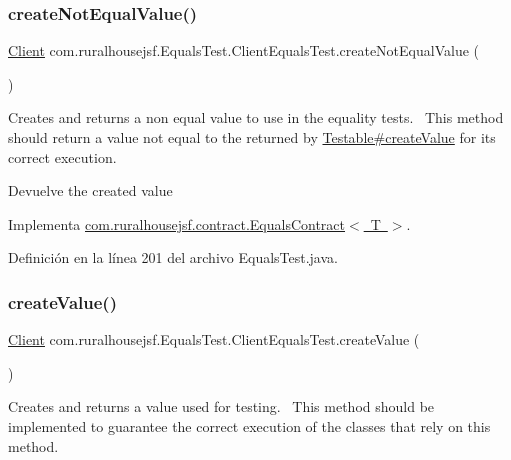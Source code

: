 \subsubsection{\texorpdfstring{createNotEqualValue()}{createNotEqualValue()}}
{\footnotesize\ttfamily \mbox{\hyperlink{classcom_1_1ruralhousejsf_1_1domain_1_1_client}{Client}} com.\+ruralhousejsf.\+Equals\+Test.\+Client\+Equals\+Test.\+create\+Not\+Equal\+Value (\begin{DoxyParamCaption}{ }\end{DoxyParamCaption})}

Creates and returns a non equal value to use in the equality tests.~\newline
 This method should return a value not equal to the returned by \mbox{\hyperlink{}{Testable\#create\+Value}} for its correct execution.

\begin{DoxyReturn}{Devuelve}
the created value 
\end{DoxyReturn}


Implementa \mbox{\hyperlink{interfacecom_1_1ruralhousejsf_1_1contract_1_1_equals_contract_a65840509b57f6b89e42e2abf1978aa01}{com.\+ruralhousejsf.\+contract.\+Equals\+Contract$<$ T $>$}}.



Definición en la línea 201 del archivo Equals\+Test.\+java.

\mbox{\label{classcom_1_1ruralhousejsf_1_1_equals_test_1_1_client_equals_test_aa74f54ea042862db1a5499d31ec75539}} 
\subsubsection{\texorpdfstring{createValue()}{createValue()}}
{\footnotesize\ttfamily \mbox{\hyperlink{classcom_1_1ruralhousejsf_1_1domain_1_1_client}{Client}} com.\+ruralhousejsf.\+Equals\+Test.\+Client\+Equals\+Test.\+create\+Value (\begin{DoxyParamCaption}{ }\end{DoxyParamCaption})}

Creates and returns a value used for testing.~\newline
 This method should be implemented to guarantee the correct execution of the classes that rely on this method.

